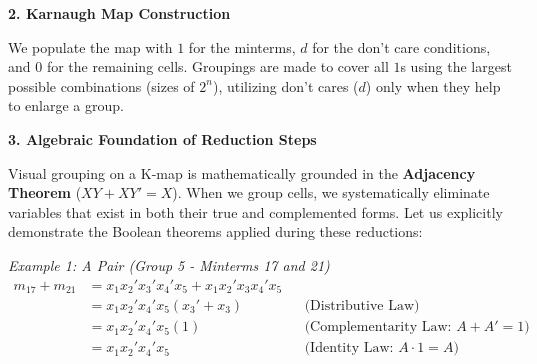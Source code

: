 \documentclass[12pt,a3paper]{article}
\begin{document}
\begin{enumerate}
\begin{tcolorbox}[enhanced,breakable,ansbox,colback=cC!4,colframe=cC,boxrule=0.8pt,arc=5pt,title={\textbf{Answer}},fonttitle=\bfseries\color{white},colbacktitle=cC]
\vspace{1em}
\textbf{2. Karnaugh Map Construction}

We populate the map with $1$ for the minterms, $d$ for the don't care conditions, and $0$ for the remaining cells. Groupings are made to cover all $1$s using the largest possible combinations (sizes of $2^n$), utilizing don't cares ($d$) only when they help to enlarge a group.

\begin{center}
\begin{karnaugh-map}[4][4][2][$x_4x_5$][$x_2x_3$][$x_1$]
    \autoterms[0]
    
    
    
\end{karnaugh-map}
\end{center}

\vspace{1em}
\textbf{3. Algebraic Foundation of Reduction Steps}

Visual grouping on a K-map is mathematically grounded in the \textbf{Adjacency Theorem} ($XY + XY' = X$). When we group cells, we systematically eliminate variables that exist in both their true and complemented forms. Let us explicitly demonstrate the Boolean theorems applied during these reductions:

\textit{Example 1: A Pair (Group 5 - Minterms 17 and 21)}
\begin{align*}
    m_{17} + m_{21} &= x_1 x_2' x_3' x_4' x_5 + x_1 x_2' x_3 x_4' x_5 \\
    &= x_1 x_2' x_4' x_5 (x_3' + x_3) && \text{(Distributive Law)} \\
    &= x_1 x_2' x_4' x_5 (1) && \text{(Complementarity Law: $A + A' = 1$)} \\
    &= x_1 x_2' x_4' x_5 && \text{(Identity Law: $A \cdot 1 = A$)}
\end{align*}


\end{tcolorbox}
\end{enumerate}
\end{document}
